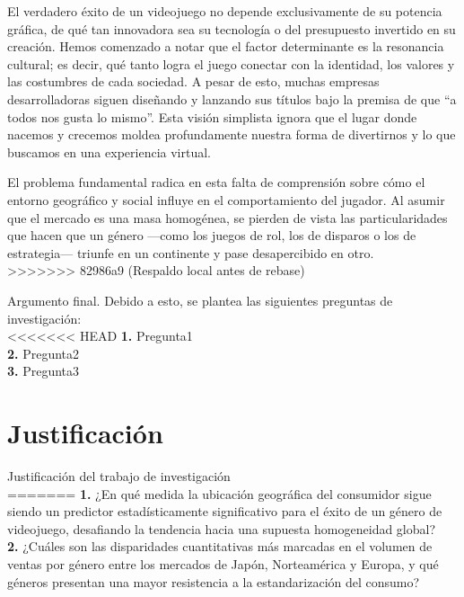 \documentclass[oneside,11pt]{Latex/Classes/PhDthesisPSnPDF}
\begin{document}
El verdadero éxito de un videojuego no depende exclusivamente de su
potencia gráfica, de qué tan innovadora sea su tecnología o del
presupuesto invertido en su creación. Hemos comenzado a notar que el
factor determinante es la resonancia cultural; es decir, qué tanto logra
el juego conectar con la identidad, los valores y las costumbres de cada
sociedad. A pesar de esto, muchas empresas desarrolladoras siguen
diseñando y lanzando sus títulos bajo la premisa de que ``a todos nos
gusta lo mismo''. Esta visión simplista ignora que el lugar donde
nacemos y crecemos moldea profundamente nuestra forma de divertirnos y
lo que buscamos en una experiencia virtual.

El problema fundamental radica en esta falta de comprensión sobre cómo
el entorno geográfico y social influye en el comportamiento del jugador.
Al asumir que el mercado es una masa homogénea, se pierden de vista las
particularidades que hacen que un género ---como los juegos de rol, los
de disparos o los de estrategia--- triunfe en un continente y pase
desapercibido en otro.\\
>>>>>>> 82986a9 (Respaldo local antes de rebase)

Argumento final. Debido a esto, se plantea las siguientes preguntas de
investigación:\\

<<<<<<< HEAD
\textbf{1.} Pregunta1\\

\textbf{2.} Pregunta2\\

\textbf{3.} Pregunta3\\

\section{Justificación}

Justificación del trabajo de investigación\\
=======
\textbf{1.} ¿En qué medida la ubicación geográfica del consumidor sigue
siendo un predictor estadísticamente significativo para el éxito de un
género de videojuego, desafiando la tendencia hacia una supuesta
homogeneidad global?\\

\textbf{2.} ¿Cuáles son las disparidades cuantitativas más marcadas en
el volumen de ventas por género entre los mercados de Japón,
Norteamérica y Europa, y qué géneros presentan una mayor resistencia a
la estandarización del consumo?\\
\end{document}
